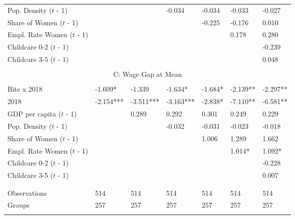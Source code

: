 \documentclass[12pt,draft,a4paper]{article}
\begin{document}
\begin{table}[htbp]
\begin{adjustbox}{width=\textwidth}
\begin{tabular}{lllllll}
    Pop. Density ($t$ - 1)     &           &           & -0.034    & -0.034    & -0.033    & -0.027    \\
    Share of Women ($t$ - 1)   &           &           &           & -0.225    & -0.176    & 0.010     \\
    Empl. Rate Women ($t$ - 1) &           &           &           &           & 0.178     & 0.280     \\
    Childcare 0-2 ($t$ - 1)    &           &           &           &           &           & -0.239    \\
    Childcare 3-5 ($t$ - 1)    &           &           &           &           &           & 0.048     \\ 
    \hline & \\[-1.0em]
    \multicolumn{7}{c}{C: Wage Gap at Mean}                                                           \\ 
    \hline & \\[-1.0em]
    Bite x 2018               & -1.609*   & -1.339    & -1.634*   & -1.684*   & -2.139**  & -2.297**  \\
    2018                      & -2.154*** & -3.511*** & -3.163*** & -2.838*   & -7.110**  & -6.581**  \\
    GDP per capita ($t$ - 1)   &           & 0.289     & 0.292     & 0.301     & 0.249     & 0.229     \\
    Pop. Density ($t$ - 1)     &           &           & -0.032    & -0.031    & -0.023    & -0.018    \\
    Share of Women ($t$ - 1)   &           &           &           & 1.006     & 1.289     & 1.662     \\
    Empl. Rate Women ($t$ - 1) &           &           &           &           & 1.014*    & 1.092*    \\
    Childcare 0-2 ($t$ - 1)    &           &           &           &           &           & -0.228    \\
    Childcare 3-5 ($t$ - 1)    &           &           &           &           &           & 0.007     \\ 
    & \\[-1.0em]
    \hline & \\[-1.0em]
    Observations              & 514       & 514       & 514       & 514       & 514       & 514       \\
    Groups                    & 257       & 257       & 257       & 257       & 257       & 257       \\
    \hline & \\[-1.0em]

\end{tabular}
\end{adjustbox}
\end{table}
\end{document}
